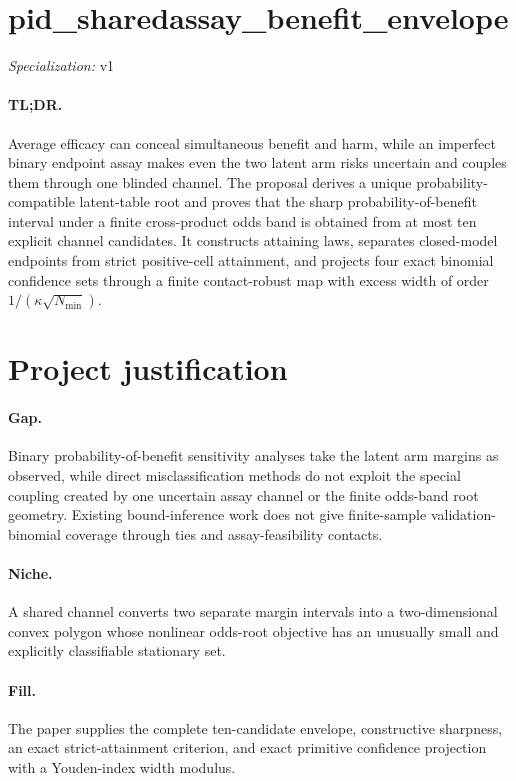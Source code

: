 \documentclass{article}
\begin{document}
\sloppy

\section*{pid\_\allowbreak{}sharedassay\_\allowbreak{}benefit\_\allowbreak{}envelope}

\noindent\textit{Specialization:} v1\par

\paragraph{TL;DR.} Average efficacy can conceal simultaneous benefit and harm, while an imperfect binary endpoint assay makes even the two latent arm risks uncertain and couples them through one blinded channel. The proposal derives a unique probability-compatible latent-table root and proves that the sharp probability-of-benefit interval under a finite cross-product odds band is obtained from at most ten explicit channel candidates. It constructs attaining laws, separates closed-model endpoints from strict positive-cell attainment, and projects four exact binomial confidence sets through a finite contact-robust map with excess width of order \(1/(\kappa\sqrt{N_{\min}})\).

\section{Project justification}

\paragraph{Gap.} Binary probability-of-benefit sensitivity analyses take the latent arm margins as observed, while direct misclassification methods do not exploit the special coupling created by one uncertain assay channel or the finite odds-band root geometry. Existing bound-inference work does not give finite-sample validation-binomial coverage through ties and assay-feasibility contacts.

\paragraph{Niche.} A shared channel converts two separate margin intervals into a two-dimensional convex polygon whose nonlinear odds-root objective has an unusually small and explicitly classifiable stationary set.

\paragraph{Fill.} The paper supplies the complete ten-candidate envelope, constructive sharpness, an exact strict-attainment criterion, and exact primitive confidence projection with a Youden-index width modulus.
\end{document}
